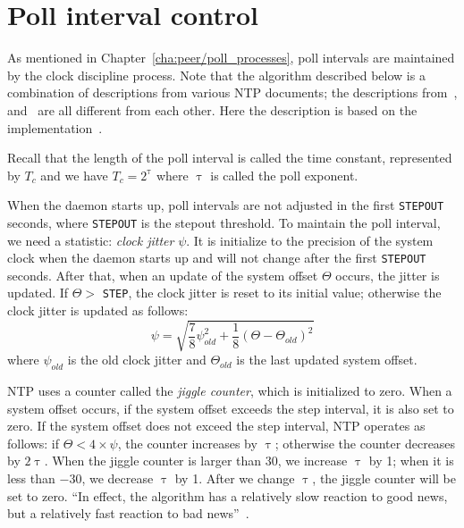 \section{Poll interval control}%
\label{sec:poll_interval_control}
As mentioned in Chapter~\ref{cha:peer/poll_processes}, poll intervals are
maintained by the clock discipline process. Note that the algorithm described
below is a combination of descriptions from various NTP documents; the
descriptions from~\cite{redbook}, \cite{poll_process} and~\cite{rfc5905} are
all different from each other. Here the description is based on the
implementation~\cite{source_code}.

Recall that the length of the poll interval is called the time constant, represented by
$T_c$ and we have $T_c = 2^\uptau$ where $\uptau$ is called the poll exponent.

When the daemon starts up, poll intervals are not adjusted in the first
\verb|STEPOUT| seconds, where \verb|STEPOUT| is the stepout threshold.
To maintain the poll interval, we need a statistic: \emph{clock jitter} $\psi$.
It is initialize to the precision of the system clock when the daemon starts up and
will not change after the first \verb|STEPOUT| seconds. After that, when an update of
the system offset $\Theta$ occurs, the jitter is updated. If $\Theta > $
\verb|STEP|, the clock jitter is reset to its initial value; otherwise the
clock jitter is updated as follows:
\begin{equation}
    \psi = \sqrt{ \frac{7}{8}\psi_{old}^2 + \frac{1}{8}\left(\Theta -
    \Theta_{old}\right)^2 }
    \label{eq:clock_jitter}
\end{equation}
where $\psi_{old}$ is the old clock jitter and $\Theta_{old}$ is the last
updated system offset. 

NTP uses a counter called the \emph{jiggle counter}, which is initialized to
zero. When a system offset occurs, if the system offset exceeds the step
interval, it is also set to zero. If the system offset does not exceed the
step interval, NTP operates as follows:
if $\Theta < 4 \times \psi$, the counter increases by $\uptau$; 
otherwise the counter decreases by $2\uptau$.
When the jiggle counter is larger than 30, we increase $\uptau$ by 1; when it
is less than $-30$, we decrease $\uptau$ by 1. After we change $\uptau$, the
jiggle counter will be set to zero. ``In effect, the algorithm has a relatively
slow reaction to good news, but a relatively fast reaction to bad
news''~\cite{poll_process}.



